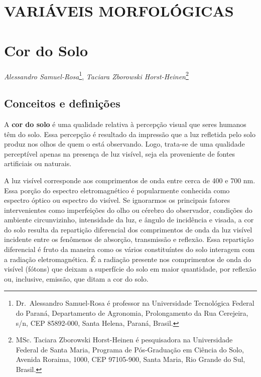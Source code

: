 \documentclass[a4paper,dvipsnames]{tufte-book}
\begin{document}
\section*{VARIÁVEIS MORFOLÓGICAS}\label{variuxe1veis-morfoluxf3gicas}

\section{Cor do Solo}\label{cor-do-solo}

\emph{Alessandro Samuel-Rosa}\footnote{Dr.~Alessandro Samuel-Rosa é
  professor na Universidade Tecnológica Federal do Paraná, Departamento
  de Agronomia, Prolongamento da Rua Cerejeira, s/n, CEP 85892-000,
  Santa Helena, Paraná, Brasil.}, \emph{Taciara Zborowski
Horst-Heinen}\footnote{MSc. Taciara Zborowski Horst-Heinen é
  pesquisadora na Universidade Federal de Santa Maria, Programa de
  Pós-Graduação em Ciência do Solo, Avenida Roraima, 1000, CEP
  97105-900, Santa Maria, Rio Grande do Sul, Brasil.}

\subsection{Conceitos e
definições}\label{conceitos-e-definiuxe7uxf5es-1}

A \textbf{cor do solo} é uma qualidade relativa à percepção visual que
seres humanos têm do solo. Essa percepção é resultado da impressão que a
luz refletida pelo solo produz nos olhos de quem o está observando.
Logo, trata-se de uma qualidade perceptível apenas na presença de luz
visível, seja ela proveniente de fontes artificiais ou naturais.

A luz visível corresponde aos comprimentos de onda entre cerca de 400 e
700 nm. Essa porção do espectro eletromagnético é popularmente conhecida
como espectro óptico ou espectro do visível. Se ignorarmos os principais
fatores intervenientes como imperfeições do olho ou cérebro do
observador, condições do ambiente circunvizinho, intensidade da luz, e
ângulo de incidência e visada, a cor do solo resulta da repartição
diferencial dos comprimentos de onda da luz visível incidente entre os
fenômenos de absorção, transmissão e reflexão. Essa repartição
diferencial é fruto da maneira como os vários constituíntes do solo
interagem com a radiação eletromagnética. É a radiação presente nos
comprimentos de onda do visível (fótons) que deixam a superfície do solo
em maior quantidade, por reflexão ou, inclusive, emissão, que ditam a
cor do solo.
\end{document}
